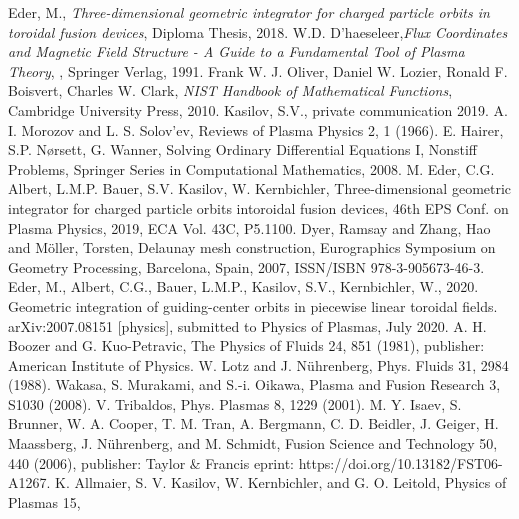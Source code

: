 \documentclass[./main.tex]{subfiles}
\begin{document}
\begin{thebibliography}{1}
	\label{chp:bibliography}
	 Eder, M., \textit{Three-dimensional geometric integrator
for charged particle orbits in toroidal fusion devices}, Diploma Thesis, 2018.
	 W.D. D'haeseleer,\textit{Flux Coordinates and Magnetic Field Structure - A Guide to a Fundamental Tool of Plasma Theory},
, Springer Verlag, 1991.
	 Frank W. J. Oliver, Daniel W. Lozier, Ronald F. Boisvert, Charles W. Clark, \textit{NIST Handbook of Mathematical Functions}, Cambridge University Press, 2010.
	 Kasilov, S.V., private communication 2019.
	 A. I. Morozov and L. S. Solov'ev, Reviews of Plasma Physics 2, 1 (1966).
	 E. Hairer, S.P. N{\o}rsett, G. Wanner, Solving Ordinary Differential Equations I, Nonstiff Problems, Springer Series in Computational Mathematics, 2008.
	 M. Eder, C.G. Albert, L.M.P. Bauer, S.V. Kasilov, W. Kernbichler, Three-dimensional geometric integrator for charged particle orbits intoroidal fusion devices, 46th EPS Conf. on Plasma Physics, 2019, ECA Vol. 43C, P5.1100.
	 Dyer, Ramsay and Zhang, Hao and Möller, Torsten, Delaunay mesh construction, Eurographics Symposium on Geometry Processing, Barcelona, Spain, 2007, ISSN/ISBN 978-3-905673-46-3. 
	 Eder, M., Albert, C.G., Bauer, L.M.P., Kasilov, S.V., Kernbichler, W., 2020. Geometric integration of guiding-center orbits in piecewise linear toroidal fields. arXiv:2007.08151 [physics], submitted to Physics of Plasmas, July 2020.
	 A. H. Boozer and G. Kuo-Petravic, The Physics of Fluids 24, 851 (1981), publisher: American Institute of Physics.
	 W. Lotz and J. N\"uhrenberg, Phys. Fluids 31, 2984 (1988).
	 Wakasa, S. Murakami, and S.-i. Oikawa, Plasma and Fusion Research 3, S1030 (2008).
	V. Tribaldos, Phys. Plasmas 8, 1229 (2001).
	M. Y. Isaev, S. Brunner, W. A. Cooper, T. M. Tran, A. Bergmann, C. D. Beidler, J. Geiger,
H. Maassberg, J. N\"uhrenberg, and M. Schmidt, Fusion Science and Technology 50, 440
(2006), publisher: Taylor \& Francis eprint: https://doi.org/10.13182/FST06-A1267.
	K. Allmaier, S. V. Kasilov, W. Kernbichler, and G. O. Leitold, Physics of Plasmas 15,

\end{thebibliography}
\end{document}
